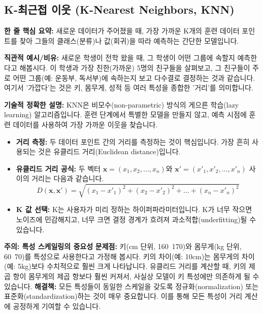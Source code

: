 \documentclass[11pt,a4paper]{article}
\theoremstyle{definition}
\begin{document}
\newpage
\subsection{K-최근접 이웃 (K-Nearest Neighbors, KNN)}

\begin{conceptbox}
\textbf{한 줄 핵심 요약:} 새로운 데이터가 주어졌을 때, 가장 가까운 K개의 훈련 데이터 포인트를 찾아 그들의 클래스(분류)나 값(회귀)을 따라 예측하는 간단한 모델입니다.
\end{conceptbox}

\textbf{직관적 예시/비유:}
새로운 학생이 전학 왔을 때, 그 학생이 어떤 그룹에 속할지 예측한다고 해봅시다. 이 학생과 가장 친한(가까운) 5명의 친구들을 살펴보고, 그 친구들이 주로 어떤 그룹(예: 운동부, 독서부)에 속하는지 보고 다수결로 결정하는 것과 같습니다. 여기서 '가깝다'는 것은 키, 몸무게, 성적 등 여러 특성을 종합한 '거리'를 의미합니다.

\textbf{기술적 정확한 설명:}
KNN은 비모수(non-parametric) 방식의 게으른 학습(lazy learning) 알고리즘입니다. 훈련 단계에서 특별한 모델을 만들지 않고, 예측 시점에 훈련 데이터를 사용하여 가장 가까운 이웃을 찾습니다.

\begin{itemize}
    \item \textbf{거리 측정:} 두 데이터 포인트 간의 거리를 측정하는 것이 핵심입니다. 가장 흔히 사용되는 것은 유클리드 거리(Euclidean distance)입니다.
    \item \textbf{유클리드 거리 공식:} 두 벡터 $\mathbf{x} = (x_1, x_2, \dots, x_n)$와 $\mathbf{x}' = (x'_1, x'_2, \dots, x'_n)$ 사이의 거리는 다음과 같습니다.
    $$ D(\mathbf{x}, \mathbf{x}') = \sqrt{(x_1 - x'_1)^2 + (x_2 - x'_2)^2 + \dots + (x_n - x'_n)^2} $$
    \item \textbf{K 값 선택:} K는 사용자가 미리 정하는 하이퍼파라미터입니다. K가 너무 작으면 노이즈에 민감해지고, 너무 크면 결정 경계가 흐려져 과소적합(underfitting)될 수 있습니다.
\end{itemize}

\begin{warningbox}
\textbf{주의: 특성 스케일링의 중요성}
\textbf{문제점:} 키(cm 단위, 160~170)와 몸무게(kg 단위, 60~70)를 특성으로 사용한다고 가정해 봅시다. 키의 차이(예: 10cm)는 몸무게의 차이(예: 5kg)보다 수치적으로 훨씬 크게 나타납니다. 유클리드 거리를 계산할 때, 키의 제곱 항이 몸무게의 제곱 항보다 훨씬 커져서, 사실상 모델이 키 특성에만 의존하게 될 수 있습니다.
\textbf{해결책:} 모든 특성들이 동일한 스케일을 갖도록 정규화(normalization) 또는 표준화(standardization)하는 것이 매우 중요합니다. 이를 통해 모든 특성이 거리 계산에 공정하게 기여할 수 있습니다.
\end{warningbox}
\end{document}
